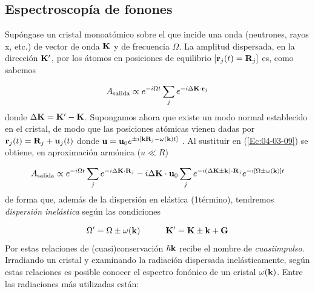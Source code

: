 \subsection{Espectroscopía de fonones}

Supóngase un cristal monoatómico sobre el que incide una onda (neutrones, rayos x, etc.) de vector de onda $\mathbf{K}$ y de frecuencia $\Omega$. La amplitud dispersada, en la dirección $\mathbf{K}'$, por los átomos en posiciones de equilibrio $[\mathbf{r}_j (t)= \mathbf{R}_j]$ es, como sabemos

\begin{equation}
    A_{\text{salida}} \propto e^{-i \Omega t } \sum_j e^{-i \Delta \mathbf{K} \cdot \mathbf{r}_j} \label{Ec:04-03-09}
\end{equation}
donde $\Delta \mathbf{K} = \mathbf{K} ' - \mathbf{K}$. Supongamos ahora que existe un modo normal establecido en el cristal, de modo que las posiciones atómicas vienen dadas por $\mathbf{r}_j(t) = \mathbf{R}_j + \mathbf{u}_j (t)$ donde $\mathbf{u}=\mathbf{u}_0  e^{\pm i \left[ \mathbf{k} \mathbf{R}_j -  \omega (\mathbf{k})t \right]}$ . Al sustituir en (\ref{Ec:04-03-09}) se obtiene, en aproximación armónica ($u \ll R$) 

\begin{equation}
    A_{\text{salida}} \propto e^{-i\Omega t} \sum_j e^{-i\Delta \mathbf{K} \cdot \mathbf{R}_j} - i \Delta \mathbf{K} \cdot \mathbf{u}_0 \sum_j e^{- i (\Delta \mathbf{K} \pm \mathbf{k}) \cdot \mathbf{R}_j} e^{- i \left[ \Omega \pm \omega (\mathbf{k}) \right]t}
\end{equation}
de forma que, además de la dispersión en elástica (1\er término), tendremos \textit{dispersión inelástica} según las condiciones 

\begin{equation}
    \Omega' = \Omega \pm \omega (\mathbf{k}) \quad \quad \quad \mathbf{K}' = \mathbf{K} \pm \mathbf{k} + \mathbf{G}
\end{equation}
Por estas relaciones de (cuasi)conservación $\hbar \mathbf{k}$ recibe el nombre de \textit{cuasiimpulso}. Irradiando un cristal y examinando la radiación dispersada inelásticamente, según estas relaciones es posible conocer el espectro fonónico de un cristal $\omega (\mathbf{k})$. Entre las radiaciones más utilizadas están:

